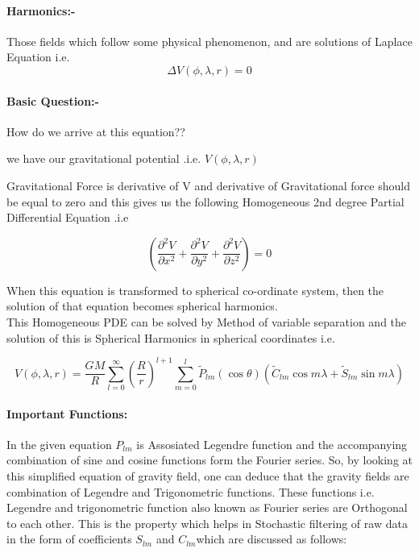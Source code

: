 \documentclass[a4paper,12pt]{article}
\begin{document}
\paragraph{Harmonics:-} 
 Those fields which follow some physical phenomenon, and are solutions of Laplace Equation i.e.
\begin {equation}
      \Delta  V(\phi,\lambda,r)=0
\end{equation}

\paragraph{Basic Question:-} How do we arrive at this equation??

we have our gravitational potential .i.e. $V(\phi,\lambda,r)$

Gravitational Force is derivative of V and derivative of Gravitational force should be equal to zero and this gives us the following Homogeneous 2nd degree Partial Differential Equation .i.e

   \[ \left( \frac{\partial^2 V}{\partial x^2}
      + \frac{\partial^2 V}{\partial y^2}
      + \frac{\partial^2 V}{\partial z^2} \right)=0 \]

When this equation is transformed to spherical co-ordinate system, then the solution of that equation becomes spherical harmonics.\\
This Homogeneous PDE  can be solved by Method of variable separation and the solution of this is Spherical Harmonics in spherical coordinates i.e.

\begin{equation}
V(\phi,\lambda,r)=\frac{GM}{R}\sum_{l=0}^{\infty} \left(\frac{R}{r}\right)^{l+1}\sum_{m=0}^{l} \widetilde{P}_{lm}(\cos\theta)(\widetilde{C}_{lm}\cos m\lambda + \widetilde{S}_{lm}\sin m\lambda)
\end{equation}

\paragraph{Important Functions:} 
In the given equation $P_{lm}$ is Assosiated Legendre function and the accompanying combination of sine and cosine functions form the Fourier series. So, by looking at this simplified equation of gravity field, one can deduce that the gravity fields are combination of Legendre and Trigonometric functions.
These functions i.e. Legendre and trigonometric function also known as Fourier series are Orthogonal to each other. This is the property which helps in Stochastic filtering of raw data in the form of coefficients $ S_{lm}$ and $C_{lm} $which are discussed as follows:  
\end{document}
